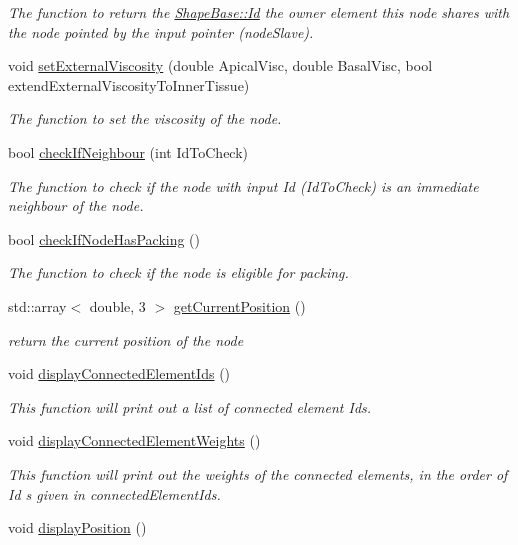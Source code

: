 \begin{DoxyCompactItemize}
\begin{DoxyCompactList}\small\item\em The function to return the \hyperlink{classShapeBase_ae097764dd4d607b54710d7ca0f7e12f8}{Shape\+Base\+::\+Id} the owner element this node shares with the node pointed by the input pointer (node\+Slave). \end{DoxyCompactList}\item 
void \hyperlink{classNode_adae4720965b558b075a91af4cf742b2a}{set\+External\+Viscosity} (double Apical\+Visc, double Basal\+Visc, bool extend\+External\+Viscosity\+To\+Inner\+Tissue)
\begin{DoxyCompactList}\small\item\em The function to set the viscosity of the node. \end{DoxyCompactList}\item 
bool \hyperlink{classNode_a7dc5a9838a0a1963e58f648c5f7cb635}{check\+If\+Neighbour} (int Id\+To\+Check)
\begin{DoxyCompactList}\small\item\em The function to check if the node with input Id (Id\+To\+Check) is an immediate neighbour of the node. \end{DoxyCompactList}\item 
bool \hyperlink{classNode_a1d80e6f467d8ca919872b6e47a882dd5}{check\+If\+Node\+Has\+Packing} ()
\begin{DoxyCompactList}\small\item\em The function to check if the node is eligible for packing. \end{DoxyCompactList}\item 
std\+::array$<$ double, 3 $>$ \hyperlink{classNode_a7c6a8e48ca7eda39cfb4b83699181cce}{get\+Current\+Position} ()
\begin{DoxyCompactList}\small\item\em return the current position of the node \end{DoxyCompactList}\item 
void \hyperlink{classNode_a3030a518aa97bd50060b8733e87540f7}{display\+Connected\+Element\+Ids} ()
\begin{DoxyCompactList}\small\item\em This function will print out a list of connected element Id\textquotesingle{}s. \end{DoxyCompactList}\item 
void \hyperlink{classNode_a755e8c3d76e7f1f0ab364fc3d4da3a9a}{display\+Connected\+Element\+Weights} ()
\begin{DoxyCompactList}\small\item\em This function will print out the weights of the connected elements, in the order of Id s given in connected\+Element\+Ids. \end{DoxyCompactList}\item 
\hypertarget{classNode_a39d2419d4de14f0d0ecffc7c7809e705}{}void \hyperlink{classNode_a39d2419d4de14f0d0ecffc7c7809e705}{display\+Position} ()\label{classNode_a39d2419d4de14f0d0ecffc7c7809e705}


\end{DoxyCompactItemize}
